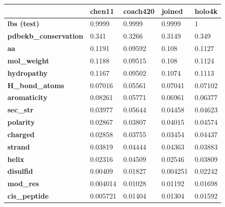 \begin{table}[] \centering
\begin{tabular}{@{}lllll@{}}
\toprule
\textbf{}                     & \textbf{chen11} & \textbf{coach420} & \textbf{joined} & \textbf{holo4k} \\ \midrule
\textbf{lbs (test)}                  & 0.9999          & 0.9999            & 0.9999          & 1               \\
\textbf{pdbekb\_conservation} & 0.341           & 0.3266            & 0.3149          & 0.349           \\
\textbf{aa}                   & 0.1191          & 0.09592           & 0.108           & 0.1127          \\
\textbf{mol\_weight}          & 0.1188          & 0.09515           & 0.108           & 0.1124          \\
\textbf{hydropathy}           & 0.1167          & 0.09502           & 0.1074          & 0.1113          \\
\textbf{H\_bond\_atoms}       & 0.07016         & 0.05561           & 0.07041         & 0.07102         \\
\textbf{aromaticity}          & 0.08261         & 0.05771           & 0.06961         & 0.06377         \\
\textbf{sec\_str}             & 0.03977         & 0.05644           & 0.04458         & 0.04623         \\
\textbf{polarity}             & 0.02867         & 0.03807           & 0.04015         & 0.04574         \\
\textbf{charged}              & 0.02858         & 0.03755           & 0.03454         & 0.04437         \\
\textbf{strand}               & 0.03819         & 0.04444           & 0.04363         & 0.03883         \\
\textbf{helix}                & 0.02316         & 0.04509           & 0.02546         & 0.03809         \\
\textbf{disulfid}             & 0.00409         & 0.01827           & 0.004251        & 0.02242         \\
\textbf{mod\_res}             & 0.004014        & 0.01028           & 0.01192         & 0.01698         \\
\textbf{cis\_peptide}         & 0.005721        & 0.01404           & 0.01304         & 0.01592         \\

\end{tabular}
\end{table}
